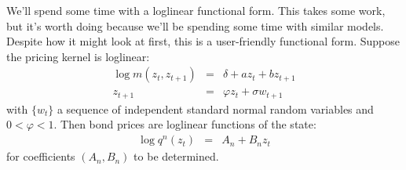 \documentclass[11pt]{article}
\begin{document}
\begin{enumerate}
We'll spend some time with a loglinear functional form.
This takes some work, but it's worth doing because we'll be spending
some time with similar models.
Despite how it might look at first, this is a user-friendly functional form.
Suppose the pricing kernel is loglinear:
\begin{eqnarray*}
    \log m(z_t, z_{t+1} ) &=& \delta + a z_t + b z_{t+1} \\
            z_{t+1} &=& \varphi z_t + \sigma w_{t+1}
\end{eqnarray*}
with $\{ w_t \} $ a sequence of independent standard normal
random variables and $0 < \varphi < 1$.
Then bond prices are loglinear functions of the state:
\begin{eqnarray}
    \log q^n(z_t) &=& A_n + B_n z_t
    \label{eq:bond-loglin}
\end{eqnarray}
for coefficients $(A_n, B_n)$ to be determined.


\end{enumerate}
\end{document}
